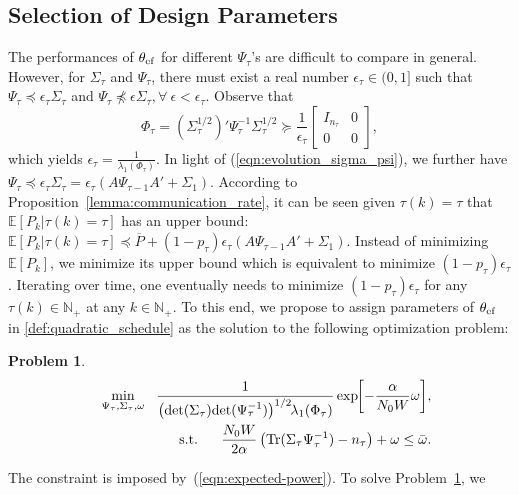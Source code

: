 \documentclass[twocolumn]{autart}    \usepackage{cite}
\newtheorem{problem}[theorem]{Problem}
\begin{document}
{{\subsection{{Selection of Design Parameters}}
\label{subsec:opt-bayesian-reference-schedule}
The performances of $\theta_{\rm ef}$ for different
$\Psi_\tau$'s are difficult to compare in general.
However, for $\Sigma_\tau$ and
$\Psi_\tau$, there must exist a
real number $\epsilon_\tau\in (0,1]$
such that $\Psi_\tau\preceq \epsilon_\tau\Sigma_\tau$ and
$\Psi_\tau\not\preceq \epsilon\Sigma_\tau,\forall~\epsilon<\epsilon_\tau$.
Observe that
$$
\Phi_\tau=\left(\Sigma_\tau^{1/2}\right)'\Psi_
\tau^{-1}\Sigma_\tau^{1/2}
\succeq \frac{1}{\epsilon_\tau}\left[
\begin{array}{cc}
I_{n_\tau} & 0\\
0& 0\end{array}\right],
$$
which yields
$\epsilon_\tau=\frac{1}
{\lambda_1(\Phi_\tau)}.$
In light of
(\ref{eqn:evolution_sigma_psi}),
we further have
$
\Psi_\tau\preceq
\epsilon_\tau\Sigma_\tau
=\epsilon_\tau\left(
A\Psi_{\tau-1}A'+\Sigma_1
\right).$
According to Proposition~\ref{lemma:communication_rate},
it can be seen given $\tau(k)=\tau$ that $\mathbb{E}[P_k|\tau(k)=\tau]$ has an
upper bound:
$\mathbb{E}[P_k|\tau(k)=\tau]\preceq
\overline{P}+(1-p_\tau)\epsilon_\tau
\left(
A\Psi_{\tau-1}A'+\Sigma_1
\right).$
Instead of minimizing $\mathbb{E}[P_k]$,
we minimize its upper bound which is equivalent to
minimize $(1-p_\tau)\epsilon_\tau$. Iterating
over time, one eventually needs to minimize $(1-p_{\tau})\epsilon_{\tau}$ for
any $\tau(k)\in \mathbb{N}_+$ at any $k\in \mathbb{N}_+$.
To this end, we propose to assign parameters of $\theta_{\rm ef}$ in
\eqref{def:quadratic_schedule} as the solution to the following
optimization problem:
\begin{problem}\label{problem:optimization_online}
  \begin{eqnarray*}
  & & \min_{\Psi_
    \tau,\Sigma_\tau,\omega}~~\frac{1}
    {\left(\mathrm{det}(\Sigma_\tau)
    \mathrm{det}(\Psi_\tau^{-1})\right)^{1/2}\hspace{-1mm}
    \lambda_1(\Phi_\tau)}\exp{\hspace{-1mm}\left[-\frac{\alpha}{
    N_0W}\omega\right]},\\
    & & ~~\,\mathrm{s.t.} ~~~~~
    \frac{N_0W}{2\alpha}\left(
    \mathrm{Tr}(\Sigma_\tau\Psi_\tau^{-1})-n_\tau\right)+\omega\leq \bar \omega.
  \end{eqnarray*}
\end{problem}
The constraint is imposed by~(\ref{eqn:expected-power}). To solve Problem~\ref{problem:optimization_online}, we
}}
\end{document}
